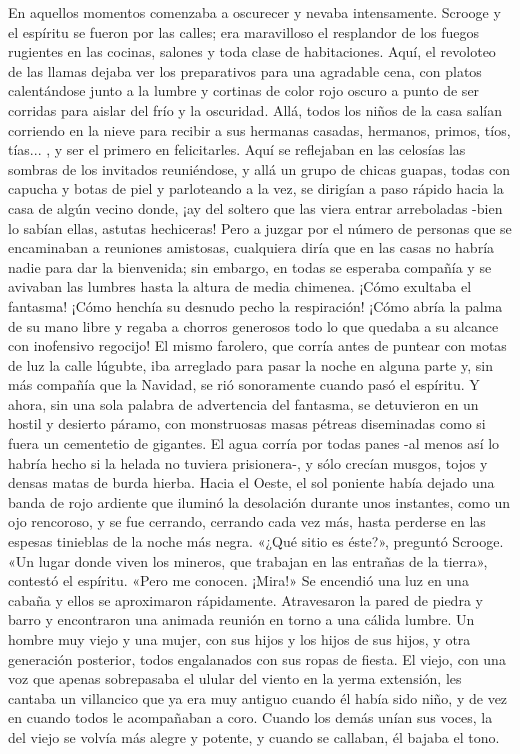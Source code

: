 \documentclass{novela}
\begin{document}
 En aquellos momentos comenzaba a oscurecer y nevaba intensamente. Scrooge y el espíritu se fueron por las calles; era maravilloso el resplandor de los fuegos rugientes en las cocinas, salones y toda clase de habitaciones. Aquí, el revoloteo de las llamas dejaba ver los preparativos para una agradable cena, con platos calentándose junto a la lumbre y cortinas de color rojo oscuro a punto de ser corridas para aislar del frío y la oscuridad. Allá, todos los niños de la casa salían corriendo en la nieve para recibir a sus hermanas casadas, hermanos, primos, tíos, tías... , y ser el primero en felicitarles. Aquí se reflejaban en las celosías las sombras de los invitados reuniéndose, y allá un grupo de chicas guapas, todas con capucha y botas de piel y parloteando a la vez, se dirigían a paso rápido hacia la casa de algún vecino donde, ¡ay del soltero que las viera entrar arreboladas -bien lo sabían ellas, astutas hechiceras!
 Pero a juzgar por el número de personas que se encaminaban a reuniones amistosas, cualquiera diría que en las casas no habría nadie para dar la bienvenida; sin embargo, en todas se esperaba compañía y se avivaban las lumbres hasta la altura de media chimenea. ¡Cómo exultaba el fantasma! ¡Cómo henchía su desnudo pecho la respiración! ¡Cómo abría la palma de su mano libre y regaba a chorros generosos todo lo que quedaba a su alcance con inofensivo regocijo! El mismo farolero, que corría antes de puntear con motas de luz la calle lúgubte, iba arreglado para pasar la noche en alguna parte y, sin más compañía que la Navidad, se rió sonoramente cuando pasó el espíritu.
 Y ahora, sin una sola palabra de advertencia del fantasma, se detuvieron en un hostil y desierto páramo, con monstruosas masas pétreas diseminadas como si fuera un cementetio de gigantes. El agua corría por todas panes -al menos así lo habría hecho si la helada no tuviera prisionera-, y sólo crecían musgos, tojos y densas matas de burda hierba. Hacia el Oeste, el sol poniente había dejado una banda de rojo ardiente que iluminó la desolación durante unos instantes, como un ojo rencoroso, y se fue cerrando, cerrando cada vez más, hasta perderse en las espesas tinieblas de la noche más negra.
 «¿Qué sitio es éste?», preguntó Scrooge.
 «Un lugar donde viven los mineros, que trabajan en las entrañas de la tierra», contestó el espíritu. «Pero me conocen. ¡Mira!»
 Se encendió una luz en una cabaña y ellos se aproximaron rápidamente. Atravesaron la pared de piedra y barro y encontraron una animada reunión en torno a una cálida lumbre. Un hombre muy viejo y una mujer, con sus hijos y los hijos de sus hijos, y otra generación posterior, todos engalanados con sus ropas de fiesta. El viejo, con una voz que apenas sobrepasaba el ulular del viento en la yerma extensión, les cantaba un villancico que ya era muy antiguo cuando él había sido niño, y de vez en cuando todos le acompañaban a coro. Cuando los demás unían sus voces, la del viejo se volvía más alegre y potente, y cuando se callaban, él bajaba el tono.
\end{document}

